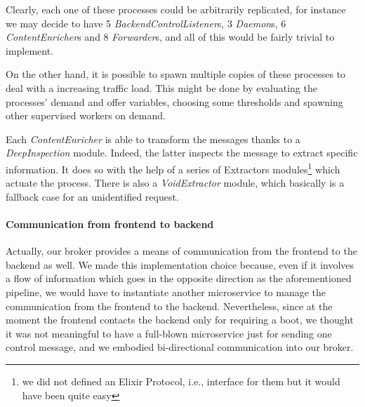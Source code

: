 Clearly, each one of these processes could be arbitrarily replicated, for
instance we may decide to have 5 \textit{BackendControlListener}s, 3
\textit{Daemon}s, 6 \textit{ContentEnricher}s and 8 \textit{Forwarder}s, and
all of this would be fairly trivial to implement.

On the other hand, it is possible to spawn multiple copies of these
processes to deal with a increasing traffic load.
This might be done by evaluating the processes' demand and offer variables,
choosing some thresholds and spawning other supervised workers on demand.

Each \textit{ContentEnricher} is able to transform the  messages thanks to a
\textit{DeepInspection} module. Indeed, the latter inspects the message
to extract specific information.
It does so with the help of a series of Extractors modules\footnote{we did not
defined an Elixir Protocol, i.e., interface for them but it would have been
quite easy} which actuate the process. There is also a \textit{VoidExtractor}
module, which basically is a fallback case for an unidentified request.

\paragraph{Communication from frontend to backend}
Actually, our broker provides a means of communication from the frontend to
the backend as well.
We made this implementation choice because, even if it involves a flow of
information which goes in the opposite direction as the aforementioned
pipeline, we would have to instantiate another microservice to manage the
communication from the frontend to the backend.
Nevertheless, since at the moment the frontend contacts the backend only for
requiring a boot, we thought it was not meaningful to have a full-blown
microservice just for sending one control message, and we embodied
bi-directional communication into our broker.
